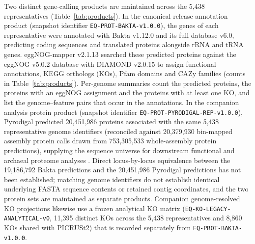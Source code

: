 \begin{revision}
Two distinct gene-calling products are maintained across the 5,438
representatives (Table~\ref{tab:products}). In the canonical release
annotation product (snapshot identifier \texttt{EQ-PROT-BAKTA-v1.0.0}),
the genes of each representative were annotated with Bakta v1.12.0
\cite{bakta} and its full database v6.0, predicting coding sequences and
translated proteins alongside rRNA and tRNA genes. eggNOG-mapper v2.1.13
\cite{eggnog} searched these predicted proteins against the eggNOG v5.0.2
database with DIAMOND v2.0.15 to assign functional annotations, KEGG
orthologs (KOs), Pfam domains and CAZy families (counts in
Table~\ref{tab:products}). Per-genome summaries count the predicted
proteins, the proteins with an eggNOG assignment and the proteins with at
least one KO, and list the genome--feature pairs that occur in the
annotations. In the companion analysis protein product (snapshot
identifier \texttt{EQ-PROT-PYRODIGAL-REP-v1.0.0}), Pyrodigal predicted
20,451,986 proteins associated with the same 5,438 representative genome
identifiers (reconciled against 20,379,930 bin-mapped assembly protein
calls drawn from 753,305,533 whole-assembly protein predictions),
supplying the sequence universe for downstream functional and archaeal
proteome analyses \cite{ecology_companion,proteome_companion}. Direct
locus-by-locus equivalence between the 19,186,792 Bakta predictions and
the 20,451,986 Pyrodigal predictions has not been established; matching
genome identifiers do not establish identical underlying FASTA sequence
contents or retained contig coordinates, and the two protein sets are
maintained as separate products. Companion genome-resolved KO projections
likewise use a frozen analytical KO matrix
(\texttt{EQ-KO-LEGACY-ANALYTICAL-v0}, 11,395 distinct KOs across the
5,438 representatives and 8,860 KOs shared with PICRUSt2) that is
recorded separately from \texttt{EQ-PROT-BAKTA-v1.0.0}.


\end{revision}

